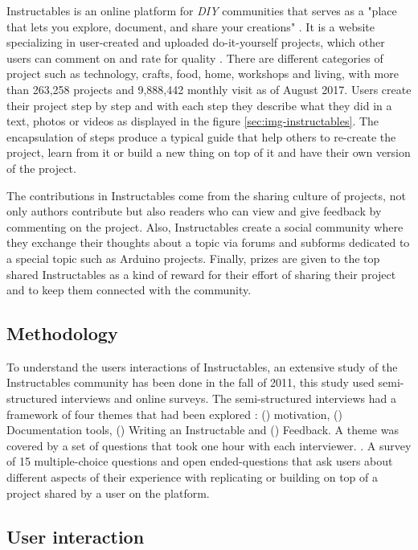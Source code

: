 Instructables is an online platform for \textit{DIY} communities that serves as a "place that lets you explore, document, and share your creations" \cite{web:instructable}. It is a website specializing in user-created and uploaded do-it-yourself projects, which other users can comment on and rate for quality \cite{wiki:instructable} \cite{wiki:instructable}. There are different categories of project such as technology, crafts, food, home, workshops and living, with more than 263,258 projects and 9,888,442 monthly visit as of August 2017. Users create their project step by step and with each step they describe what they did in a text, photos or videos as displayed in the figure \ref{sec:img-instructables}. The encapsulation of steps produce a typical guide that help others to re-create the project, learn from it or build a new thing on top of it and have their own version of the project. 

The contributions in Instructables come from the sharing culture of projects, not only authors contribute but also readers who can view and give feedback by commenting on the project. Also, Instructables create a social community where they exchange their thoughts about a topic via forums and subforms dedicated to a special topic such as Arduino projects. Finally, prizes are given to the top shared Instructables as a kind of reward for their effort of sharing their project and to keep them connected with the community.

\subsection{Methodology} 

To understand the users interactions of Instructables, an extensive study of the Instructables community has been done in the fall of 2011, this study used semi-structured interviews and online surveys. The semi-structured interviews had a framework of four themes that had been explored : () motivation, () Documentation tools, () Writing an Instructable and () Feedback. A theme was covered by a set of questions that took one hour with each interviewer. \cite{scholar:Tseng:2014:PVP:2598510.2598540}. A survey of 15 multiple-choice questions and open ended-questions that ask users about different aspects of their experience with replicating or building on top of a project shared by a user on the platform.

\subsection{User interaction}

